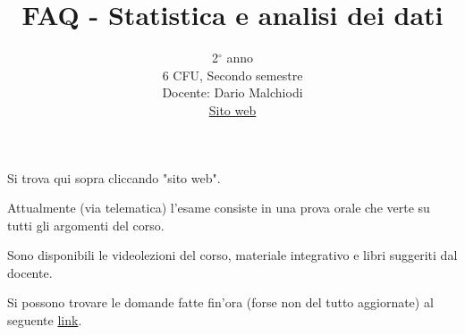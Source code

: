 \documentclass{article}
\title{FAQ - \textbf{Statistica e analisi dei dati}}
\author{
	2$^{\circ}$ anno\\6 CFU, Secondo semestre\\
	Docente: Dario Malchiodi\\ 
	\href{https://malchiodi.di.unimi.it/teaching/SAD/}{Sito web}
	\date{}
}
\begin{document}
 
	\maketitle
	
	\begin{QuestionList}
		
		 {
		     Si trova qui sopra cliccando "sito web".
		 }
		
		 {
		    Attualmente (via telematica) l'esame consiste in una prova orale che verte su tutti gli argomenti del corso.
		}
		
		 {
		    Sono disponibili le videolezioni del corso, materiale integrativo e libri suggeriti dal docente.
		}
		
		 {
		    Si possono trovare le domande fatte fin'ora (forse non del tutto aggiornate) al seguente
		    \href{https://colab.research.google.com/drive/1ASYHnmJWRo47sAbcHxhjAZErZjOZaKYP?usp=sharing}{link}.
		}
		
	\end{QuestionList}
	
\end{document}
